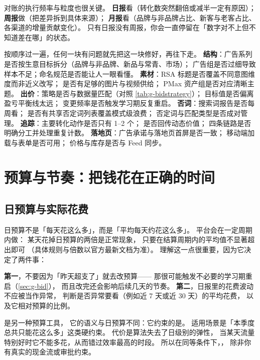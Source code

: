 对账的执行频率与粒度也很关键。
\textbf{日报}看（转化数突然翻倍或减半一定有原因）；
\textbf{周报}做（把差异拆到具体来源）；
\textbf{月报}看（品牌与非品牌占比、新客与老客占比、
各渠道的增量贡献变化）。
只有日报没有周报，你会一直停留在「数字对不上但不知道差在哪」的状态。

\begin{toolbox}
按顺序过一遍，任何一块有问题就先把这一块修好，再往下走。
\textbf{结构}：广告系列是否按生意目标拆分（品牌与非品牌、新品与常青、市场）；
       广告组是否过细导致样本不足；命名规范是否能让人一眼看懂。
\textbf{素材}：RSA 标题是否覆盖不同意图维度而非近义改写；
       是否有足够的图片与视频供给；
       PMax 资产组是否对应清晰主题。
\textbf{出价}：策略是否与数据量匹配（对照 \cref{tab:g-bidstrategy}）；
       目标值是否偏离盈亏平衡线太远；
       变更频率是否触发学习期反复重启。
\textbf{否词}：搜索词报告是否每周看；
       是否有共享否定词列表覆盖模式级浪费；
       否定词与匹配类型是否成对管理。
\textbf{追踪}：主要转化动作是否只有 1--2 个；
       是否回传动态价值；
       四条链路是否明确分工并处理重复计数。
\textbf{落地页}：广告承诺与落地页首屏是否一致；
       移动端加载与表单是否可用；
       价格与库存是否与 Feed 同步。
\end{toolbox}

\section{预算与节奏：把钱花在正确的时间}
\label{sec:g-budget}

\subsection{日预算与实际花费}

日预算不是「每天花这么多」，而是「平均每天约花这么多」。
平台会在一定周期内做：
某天花掉日预算的两倍是正常现象，
只要在结算周期内的平均值不显著超出即可
（具体规则与倍数以官方最新文档为准）。
理解这一点很重要，因为它决定了两件事：

\textbf{第一}，不要因为「昨天超支了」就去改预算——
那很可能触发不必要的学习期重启（\cref{sec:g-bid}），
而且改完还会影响后续几天的节奏。
\textbf{第二}，日报里的花费波动不应被当作异常，
判断是否异常要看（例如近 7 天或近 30 天）的平均花费，
以及它相对预算的比例。

 是另一种预算工具，
它的语义与日预算不同：它约束的是。
适用场景是「本季度总共只能花这么多」这类硬约束。
代价是算法失去了日级别的弹性，
当某天流量特别好时它不能多花，从而错过效率最高的时段。
所以在同等条件下，，
除非你有真实的现金流或审批约束。

